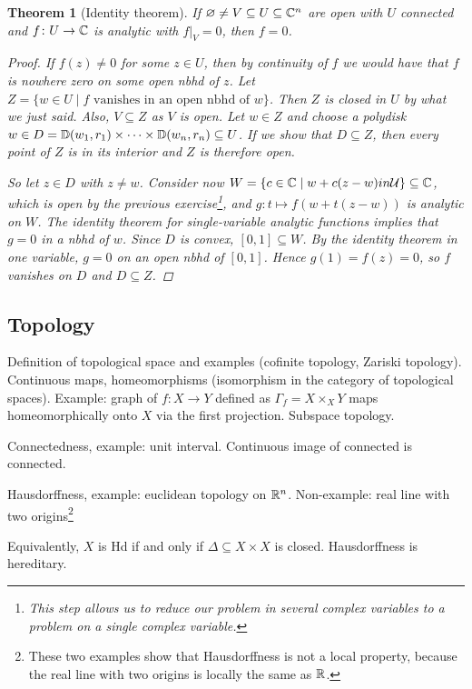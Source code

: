\documentclass[A4paper, british, reqno]{amsart}
\theoremstyle{darkgreentheorem}
\newtheorem{thm}{Theorem}[section]
\theoremstyle{darkbluedefinition}
\theoremstyle{darkredexample}
\theoremstyle{remark}
\newcommand{\1}{\mathbbm{1}}
\newcommand{\fp}[1]{\times_{#1}}
\begin{document}
\begin{thm}[Identity theorem]
    If $\varnothing \neq V\subseteq U\subseteq \mathbb{C}^{n}$ are open with $U$ connected and $f\colon U\to \mathbb{C}$ is analytic with $f|_{V}=0$, then $f=0$.
    \begin{proof}
	If $f(z)\neq 0$ for some $z\in U$, then by continuity of $f$ we would have that $f$ is nowhere zero on some open nbhd of $z$.
	Let $Z=\{w\in U\mid f \text{ vanishes in an open nbhd of }w\}$.
	Then $Z$ is closed in $U$ by what we just said.
	Also, $V\subseteq Z$ as $V$ is open.
	Let $w\in Z$ and choose a polydisk $w\in D=\mathbb{D}(w_{1},r_{1})\times \cdots \times \mathbb{D}(w_{n},r_{n})\subseteq U$.
	If we show that $D\subseteq Z$, then every point of $Z$ is in its interior and $Z$ is therefore open.
	
	So let $z\in D$ with $z\neq w$.
	Consider now $W=\{c\in \mathbb{C}\mid w+c(z-w)in \mathcal{U}\}\subseteq \mathbb{C}$, which is open by the previous exercise\footnote{This step allows us to reduce our problem in several complex variables to a problem on a single complex variable.}, and $g\colon t\mapsto f(w+t(z-w))$ is analytic on $W$.
	The identity theorem for single-variable analytic functions implies that $g=0$ in a nbhd of $w$.
	Since $D$ is convex, $[0,1]\subseteq W$.
	By the identity theorem in one variable, $g=0$ on an open nbhd of $[0,1]$.
	Hence $g(1)=f(z)=0$, so $f$ vanishes on $D$ and $D\subseteq Z$.
    \end{proof}
\end{thm}

\subsection{Topology}

Definition of topological space and examples (cofinite topology, Zariski topology).
Continuous maps, homeomorphisms (isomorphism in the category of topological spaces).
Example: graph of $f\colon X\to Y$ defined as $\Gamma_{f}=X\fp{X}Y$ maps homeomorphically onto $X$ via the first projection.
Subspace topology.

Connectedness, example: unit interval.
Continuous image of connected is connected.

Hausdorffness, example: euclidean topology on $\mathbb{R}^{n}$.
Non-example: real line with two origins\footnote{These two examples show that Hausdorffness is not a local property, because the real line with two origins is locally the same as $\mathbb{R}$.}

Equivalently, $X$ is Hd if and only if $\Delta\subseteq X\times X$ is closed.
Hausdorffness is hereditary.
\end{document}
